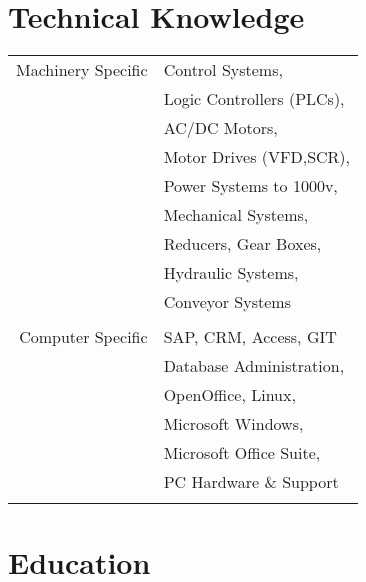 \documentclass[11pt]{article} %
\begin{document}
\begin{minipage}[t]{0.44\textwidth}
\begin{tabular}{rl}
\end{tabular}\\[10pt]


\section{Technical Knowledge} 

\begin{tabular}{rl}
Machinery Specific
& Control Systems, \\ 
& Logic Controllers (PLCs), \\
& AC/DC Motors, \\
& Motor Drives (VFD,SCR), \\
& Power Systems to 1000v, \\
& Mechanical Systems, \\
& Reducers, Gear Boxes, \\
& Hydraulic Systems, \\
& Conveyor Systems \\ \\
Computer Specific
& SAP, CRM, Access, GIT \\
& Database Administration, \\
& OpenOffice, Linux,\\
& Microsoft Windows, \\
& Microsoft Office Suite, \\
& PC Hardware \& Support\\%
\\
\end{tabular}


\section{Education} 

\begin{tabular}{rl} %



\end{tabular}
\end{minipage}
\end{document}
